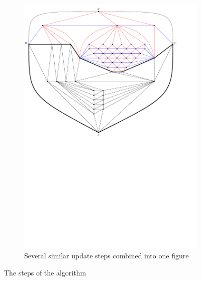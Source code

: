 \begin{figure}
\begin{subfigure}[b]{.9 \textwidth}
      \includegraphics[width=\textwidth]{examples/img/vertWorstCase/sweep4}
      \caption{Several similar update steps combined into one figure}
      \label{fig:ex:vert:sweep4}
    \end{subfigure}
    \caption{The steps of the algorithm}
\end{figure}

